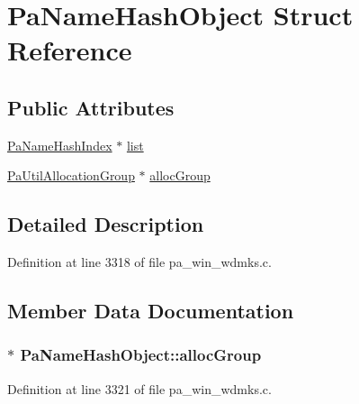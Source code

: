 \hypertarget{struct_pa_name_hash_object}{}\section{Pa\+Name\+Hash\+Object Struct Reference}
\label{struct_pa_name_hash_object}
\subsection*{Public Attributes}
\begin{DoxyCompactItemize}
\item 
\hyperlink{struct_pa_name_hash_index}{Pa\+Name\+Hash\+Index} $\ast$ \hyperlink{struct_pa_name_hash_object_ada1bf0a5ecdb49c678e1c4bbd1c83ffb}{list}
\item 
\hyperlink{struct_pa_util_allocation_group}{Pa\+Util\+Allocation\+Group} $\ast$ \hyperlink{struct_pa_name_hash_object_a53ffe8caece1284f03f9be7a0124cccf}{alloc\+Group}
\end{DoxyCompactItemize}


\subsection{Detailed Description}


Definition at line 3318 of file pa\+\_\+win\+\_\+wdmks.\+c.



\subsection{Member Data Documentation}
\subsubsection[{\texorpdfstring{alloc\+Group}{allocGroup}}]{$\ast$ Pa\+Name\+Hash\+Object\+::alloc\+Group}\hypertarget{struct_pa_name_hash_object_a53ffe8caece1284f03f9be7a0124cccf}{}\label{struct_pa_name_hash_object_a53ffe8caece1284f03f9be7a0124cccf}


Definition at line 3321 of file pa\+\_\+win\+\_\+wdmks.\+c.

